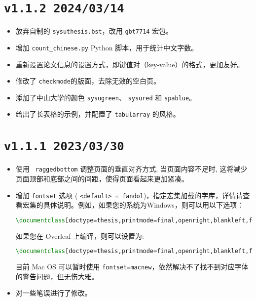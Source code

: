 \section*{\texttt{v1.1.2 2024/03/14}}
\begin{itemize}
    \item 放弃自制的 \texttt{sysuthesis.bst}，改用 \texttt{gbt7714} 宏包。
    \item 增加  \texttt{count\_chinese.py} Python 脚本，用于统计中文字数。
    \item 重新设置论文信息的设置方式，即键值对（key-value）的格式，更加友好。
    \item 修改了 \texttt{checkmode}的版面，去除无效的空白页。
    \item 添加了中山大学的颜色 \texttt{sysugreen}、 \texttt{sysured} 和 \texttt{spablue}。
    \item 给出了长表格的示例，并配置了 \texttt{tabularray} 的风格。
\end{itemize}

\section*{\texttt{v1.1.1 2023/03/30}}
\begin{itemize}
    \item 使用 \texttt{ raggedbottom} 调整页面的垂直对齐方式, 当页面内容不足时, 这将减少页面顶部和底部之间的间距，使得页面看起来更加紧凑。
    \item 增加 \texttt{fontset} 选项 ( \texttt{<default> = fandol})，指定\CTeX{}宏集加载的字库，详情请查看\CTeX{}宏集的具体说明。例如，如果您的系统为Windows，则可以用以下选项：
\begin{lstlisting}[language=TeX]
\documentclass[doctype=thesis,printmode=final,openright,blankleft,fontset=windows]{sysuthesis}
\end{lstlisting}
    如果您在 Overleaf 上编译，则可以设置为:
\begin{lstlisting}[language=TeX]
\documentclass[doctype=thesis,printmode=final,openright,blankleft,fontset=ubuntu]{sysuthesis}
\end{lstlisting}
    目前 Mac OS 可以暂时使用 \texttt{fontset=macnew}，依然解决不了找不到对应字体的警告问题，但无伤大雅。
    \item 对一些笔误进行了修改。
\end{itemize}

